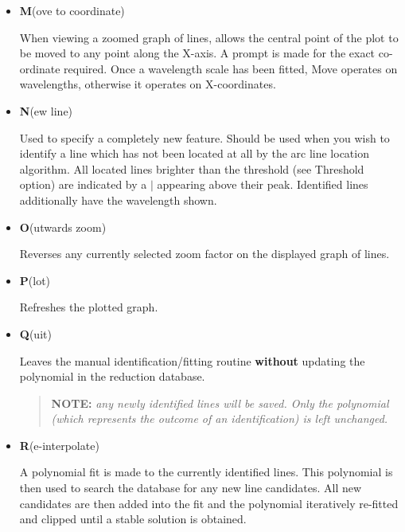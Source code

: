 \documentclass[11pt,twoside]{article}
\newcommand{\sunspec}[2]{#1}
\renewcommand{\sunspec}[2]{#2}
\newcommand{\myindex}[1]{\index{#1}}
\renewcommand{\myindex}[1]{}
\begin{document}
\begin{itemize}
\begin{itemize}
      \item {\sunspec{\Large\tt}{\bf} M}(ove to coordinate)

            When viewing a zoomed graph
            of lines, allows the central point of the plot to be moved to
            any point along the X-axis. A prompt is made for the exact
            co-ordinate required. Once a wavelength scale has been fitted,
            Move operates on wavelengths, otherwise it operates on
            X-coordinates.

      \item {\sunspec{\Large\tt}{\bf} N}(ew line)
            \myindex{Arc fitting!new line}

            Used to specify a completely new
            feature. Should be used when you wish to identify a line which
            has not been located at all by the arc line location algorithm.
            All located lines brighter than the threshold (see Threshold
            option) are indicated by a \(\mid\) appearing above their peak.
            Identified lines additionally have the wavelength shown.

      \item {\sunspec{\Large\tt}{\bf} O}(utwards zoom)

            Reverses any currently selected
            zoom factor on the displayed graph of lines.

      \item {\sunspec{\Large\tt}{\bf} P}(lot)

            Refreshes the plotted graph.

      \item {\sunspec{\Large\tt}{\bf} Q}(uit)

            Leaves the manual identification/fitting
            routine {\bf without} updating the polynomial in the reduction
            database.

            \begin{quote}

               {\bf NOTE:} {\sl any newly identified lines will be saved.
               Only the polynomial (which represents the outcome of an
               identification) is left unchanged.}

            \end{quote}

      \item {\sunspec{\Large\tt}{\bf} R}(e-interpolate)

            A polynomial fit is made to the
            currently identified lines. This polynomial is then used to
            search the database for any new line candidates. All new
            candidates are then added into the fit and the polynomial
            iteratively re-fitted and clipped until a stable solution is
            obtained.


\end{itemize}
\end{itemize}
\end{document}
